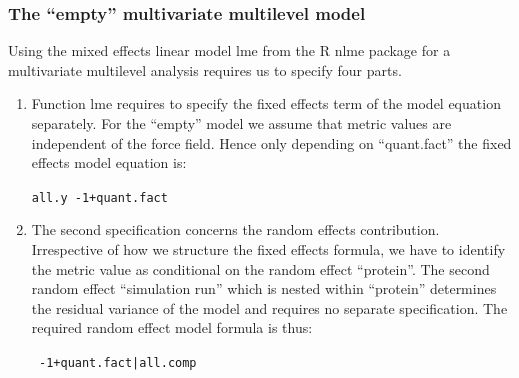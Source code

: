 \documentclass{article}\usepackage[table]{xcolor}
\makeatletter
\newcommand{\hlnum}[1]{\textcolor[rgb]{0.686,0.059,0.569}{#1}}%
\newcommand{\hlopt}[1]{\textcolor[rgb]{0,0,0}{#1}}%
\newcommand{\hlstd}[1]{\textcolor[rgb]{0.345,0.345,0.345}{#1}}%
\newenvironment{kframe}{%
 \def\at@end@of@kframe{}%
 \ifinner\ifhmode%
  \def\at@end@of@kframe{\end{minipage}}%
  \begin{minipage}{\columnwidth}%
 \fi\fi%
 \def\FrameCommand##1{\hskip\@totalleftmargin \hskip-\fboxsep
 \colorbox{shadecolor}{##1}\hskip-\fboxsep
     \hskip-\linewidth \hskip-\@totalleftmargin \hskip\columnwidth}%
 \MakeFramed {\advance\hsize-\width
   \@totalleftmargin\z@ \linewidth\hsize
   \@setminipage}}%
 {\par\unskip\endMakeFramed%
 \at@end@of@kframe}
\newenvironment{knitrout}{}{} %
\renewcommand{\$}{$} %
\makeatother
\begin{document}
\subsubsection{The ``empty'' multivariate multilevel model}
Using the mixed effects linear model lme from the R nlme package for a
multivariate multilevel analysis requires us to specify four parts.
\begin{enumerate}
\item Function lme requires to specify the fixed effects term of the
  model equation separately. For the ``empty'' model we assume that
  metric values are independent of the force field. Hence only
  depending on ``quant.fact'' the fixed effects model equation is:
\begin{knitrout}
\color{fgcolor}\begin{kframe}
\begin{alltt}
\hlstd{all.y}\hlopt{~-}\hlnum{1}\hlopt{+}\hlstd{quant.fact}
\end{alltt}
\end{kframe}
\end{knitrout}

\item The second specification concerns the random effects
  contribution. Irrespective of how we structure the fixed effects
  formula, we have to identify the metric value as conditional on
  the random effect ``protein''. The second random effect ``simulation
  run'' which is nested within ``protein'' determines the residual
  variance of the model and requires no separate specification. The
  required random effect model formula is thus:
\begin{knitrout}
\color{fgcolor}\begin{kframe}
\begin{alltt}
\hlopt{~ -}\hlnum{1}\hlopt{+}\hlstd{quant.fact}\hlopt{|}\hlstd{all.comp}
\end{alltt}
\end{kframe}
\end{knitrout}


\end{enumerate}
\end{document}
